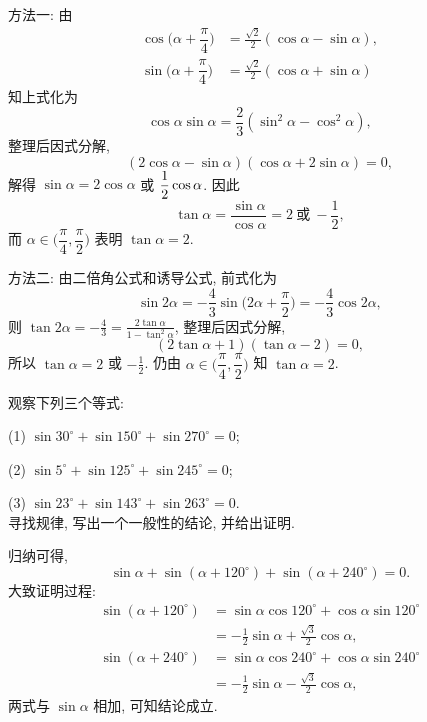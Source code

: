     方法一: 由
    \[\begin{aligned}
        \cos\biggl(\alpha+\dfrac\pi4\biggr)
        &= \frac{\sqrt2}{2}(\cos\alpha- \sin\alpha),\\
        \sin\biggl(\alpha+\dfrac\pi4\biggr)
        &= \frac{\sqrt2}{2}(\cos\alpha+ \sin\alpha)
    \end{aligned}\]
    知上式化为
    \[\cos\alpha\sin\alpha
    = \frac23(\sin^2\alpha- \cos^2\alpha),\]
    整理后因式分解,
    \[(2\cos\alpha- \sin\alpha)(\cos\alpha+ 2\sin\alpha)= 0,\]
    解得 $\sin\alpha= 2\cos\alpha$ 或 $\-\dfrac12\cos\alpha$. 因此
    \[\tan\alpha= \frac{\sin\alpha}{\cos\alpha}
        = 2\ \text{或}\ -\frac12,\]
    而 $\alpha\in\Big(\dfrac\pi4,\dfrac\pi2\Big)$ 表明 $\tan\alpha=2$.

    方法二: 由二倍角公式和诱导公式, 前式化为
    \[\sin2\alpha
    = -\frac43\sin\biggl(2\alpha+\dfrac\pi2\biggr)
    = -\frac43\cos2\alpha,\]
    则 $\tan2\alpha= -\frac43= \frac{2\tan\alpha}{1-\tan^2\alpha}$, 整理后因式分解,
    \[(2\tan\alpha+ 1)(\tan\alpha- 2)= 0,\]
    所以 $\tan\alpha= 2$ 或 $-\frac12$. 仍由 $\alpha\in\Big(\dfrac\pi4,\dfrac\pi2\Big)$ 知 $\tan\alpha=2$.
\endsolution

\begin{exercise}
    观察下列三个等式:
    
    (1) $\sin30^\circ+ \sin150^\circ+ \sin270^\circ= 0$;
    
    (2) $\sin5^\circ+ \sin125^\circ+ \sin245^\circ= 0$;
    
    (3) $\sin23^\circ+ \sin143^\circ+ \sin263^\circ= 0$.\\
    寻找规律, 写出一个一般性的结论, 并给出证明.
\end{exercise}
\beginsolution
    归纳可得,
    \[\sin\alpha+ \sin(\alpha+ 120^\circ)+ 
        \sin(\alpha+ 240^\circ)= 0.\]
    大致证明过程: 
    \[\begin{aligned}
        \sin(\alpha+ 120^\circ)
        &= \sin\alpha\cos120^\circ+ \cos\alpha\sin120^\circ\\
        &= -\frac12\sin\alpha+ \frac{\sqrt3}{2}\cos\alpha,\\
        \sin(\alpha+ 240^\circ)
        &= \sin\alpha\cos240^\circ+ \cos\alpha\sin240^\circ\\
        &= -\frac12\sin\alpha- \frac{\sqrt3}{2}\cos\alpha,
    \end{aligned}\]
    两式与 $\sin\alpha$ 相加, 可知结论成立.
\endsolution

